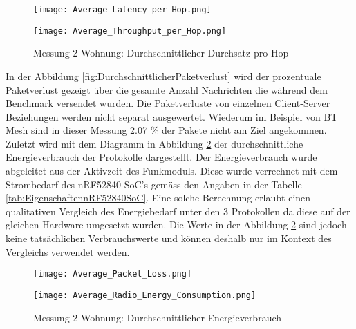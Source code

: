 \begin{figure}[!htbp]
\centering
\begin{minipage}[b]{0.49\textwidth}
		\centering
		\texttt{[image: Average\_Latency\_per\_Hop.png]}
		\caption{Messung 2 Wohnung: Durchschnittliche Latenzzeit pro Hop}
		\label{fig:DurchschnittlicheLatenzzeit}
\end{minipage}
\begin{minipage}[b]{0.49\textwidth}
		\centering
		\texttt{[image: Average\_Throughput\_per\_Hop.png]}
		\caption{Messung 2 Wohnung: Durchschnittlicher Durchsatz pro Hop}
		\label{fig:DurchschnittlicherDurchsatz}
\end{minipage}
\end{figure}

In der Abbildung \ref{fig:DurchschnittlicherPaketverlust} wird der prozentuale Paketverlust gezeigt über die gesamte Anzahl Nachrichten die während dem Benchmark versendet wurden. Die Paketverluste von einzelnen Client-Server Beziehungen werden nicht separat ausgewertet.
Wiederum im Beispiel von BT Mesh sind in dieser Messung 2.07 \% der Pakete nicht am Ziel angekommen.
Zuletzt wird mit dem Diagramm in Abbildung \ref{fig:DurchschnittlicherEnergieverbrauch} der durchschnittliche Energieverbrauch der Protokolle dargestellt.
Der Energieverbrauch wurde abgeleitet aus der Aktivzeit des Funkmoduls. Diese wurde verrechnet mit dem Strombedarf des nRF52840 SoC's gemäss den Angaben in der Tabelle \ref{tab:EigenschaftennRF52840SoC}. Eine solche Berechnung erlaubt einen qualitativen Vergleich des Energiebedarf unter den 3 Protokollen da diese auf der gleichen Hardware umgesetzt wurden. Die Werte in der Abbildung \ref{fig:DurchschnittlicherEnergieverbrauch} sind jedoch keine tatsächlichen Verbrauchswerte und können deshalb nur im Kontext des Vergleichs verwendet werden.


\begin{figure}[!htbp]
\centering
\begin{minipage}[b]{0.49\textwidth}
		\centering
		\texttt{[image: Average\_Packet\_Loss.png]}
		\caption{Messung 2 Wohnung: Durchschnittlicher Paketverlust}
		\label{fig:DurchschnittlicherPaketverlust}
\end{minipage}
\begin{minipage}[b]{0.49\textwidth}
		\centering
		\texttt{[image: Average\_Radio\_Energy\_Consumption.png]}
		\caption{Messung 2 Wohnung: Durchschnittlicher Energieverbrauch}
		\label{fig:DurchschnittlicherEnergieverbrauch}
\end{minipage}
\end{figure}


